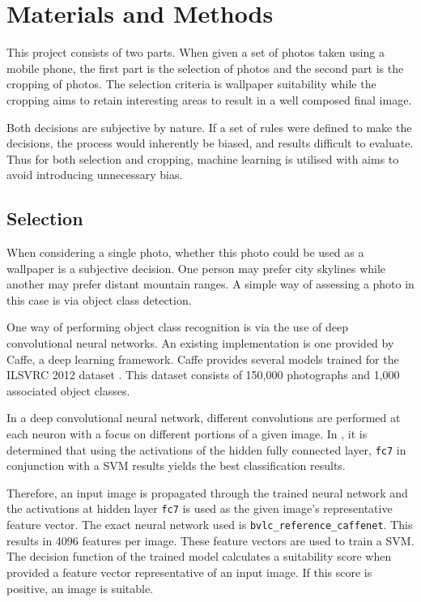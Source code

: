 %
\newpage
\chapter{Materials and Methods}

This project consists of two parts. When given a set of photos taken using a
mobile phone, the first part is the selection of photos and the second part is
the cropping of photos.
The selection criteria is wallpaper suitability while the cropping aims to
retain interesting areas to result in a well composed final image.

Both decisions are subjective by nature.
If a set of rules were defined to make the decisions, the process would
inherently be biased, and results difficult to evaluate.
Thus for both selection and cropping, machine learning is utilised with aims to
avoid introducing unnecessary bias.


\section{Selection}

When considering a single photo, whether this photo could be used as a wallpaper
is a subjective decision.
One person may prefer city skylines while another may prefer distant mountain
ranges.
A simple way of assessing a photo in this case is via object class detection.

One way of performing object class recognition is via the use of deep
convolutional neural networks.
An existing implementation is one provided by Caffe, a deep learning framework.
Caffe provides several models trained for the ILSVRC 2012 dataset \cite{ILSVRC15}.
This dataset consists of 150,000 photographs and 1,000 associated object classes.

In a deep convolutional neural network, different convolutions are performed at
each neuron with a focus on different portions of a given image.
In \cite{DonahueJVHZTD13}, it is determined that using the activations of the
hidden fully connected layer, \texttt{fc7} in conjunction with a SVM results
yields the best classification results.

Therefore, an input image is propagated through the trained neural network and
the activations at hidden layer \texttt{fc7} is used as the given image’s
representative feature vector.
The exact neural network used is \texttt{bvlc\_reference\_caffenet}.
This results in 4096 features per image.
These feature vectors are used to train a SVM.
The decision function of the trained model calculates a suitability score when
provided a feature vector representative of an input image.
If this score is positive, an image is suitable.

